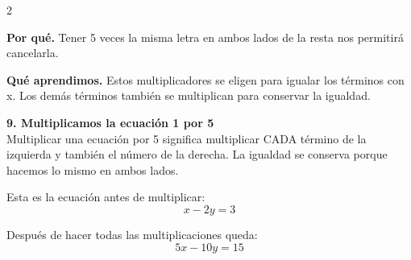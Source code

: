 \documentclass[11pt,a4paper,landscape]{article}
\begin{document}
\begin{multicols*}{2}
\begin{minipage}{\linewidth}
\par\smallskip\textbf{Por qué.} Tener 5 veces la misma letra en ambos lados de la resta nos permitirá cancelarla.
\par{}\par\smallskip
\par\smallskip\textbf{Qué aprendimos.} Estos multiplicadores se eligen para igualar los términos con x. Los demás términos también se multiplican para conservar la igualdad.
\end{minipage}\par\medskip
\noindent\begin{minipage}{\linewidth}\textbf{9. Multiplicamos la ecuación 1 por 5}\\[2pt]Multiplicar una ecuación por 5 significa multiplicar CADA término de la izquierda y también el número de la derecha. La igualdad se conserva porque hacemos lo mismo en ambos lados.
\par\smallskip Esta es la ecuación antes de multiplicar:
\[x - 2y = 3\]
\par{}\par\smallskip
\par\smallskip Después de hacer todas las multiplicaciones queda:
\[5x - 10y = 15\]

\end{minipage}
\end{multicols*}
\end{document}
